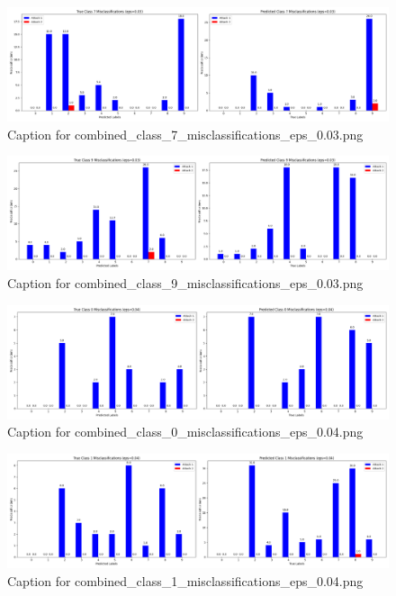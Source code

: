 \documentclass[11pt,onside]{article}
\begin{document}
\begin{figure}[ht]
\centering
\includegraphics[width=1\textwidth]{combined_class_boundary_pgd/combined_class_7_misclassifications_eps_0.03.png}
\caption{Caption for combined_class_7_misclassifications_eps_0.03.png}
\label{fig:combined_class_7_misclassifications_eps_0.03.png}
\end{figure}

\begin{figure}[ht]
\centering
\includegraphics[width=1\textwidth]{combined_class_boundary_pgd/combined_class_9_misclassifications_eps_0.03.png}
\caption{Caption for combined_class_9_misclassifications_eps_0.03.png}
\label{fig:combined_class_9_misclassifications_eps_0.03.png}
\end{figure}

\begin{figure}[ht]
\centering
\includegraphics[width=1\textwidth]{combined_class_boundary_pgd/combined_class_0_misclassifications_eps_0.04.png}
\caption{Caption for combined_class_0_misclassifications_eps_0.04.png}
\label{fig:combined_class_0_misclassifications_eps_0.04.png}
\end{figure}

\begin{figure}[ht]
\centering
\includegraphics[width=1\textwidth]{combined_class_boundary_pgd/combined_class_1_misclassifications_eps_0.04.png}
\caption{Caption for combined_class_1_misclassifications_eps_0.04.png}
\label{fig:combined_class_1_misclassifications_eps_0.04.png}
\end{figure}
\end{document}
